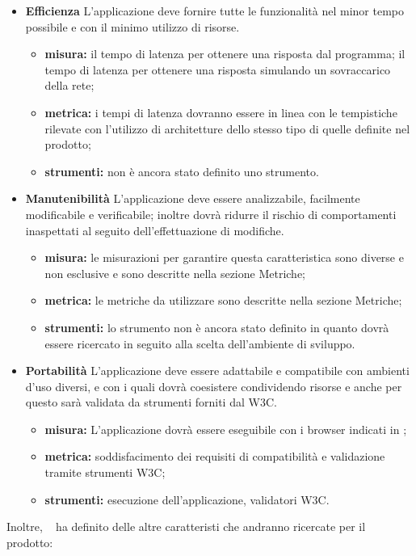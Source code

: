 \begin{itemize}
\item \textbf{Efficienza}
L’applicazione deve fornire tutte le funzionalità nel minor tempo possibile e con il minimo utilizzo di risorse.
\begin{itemize}
\item \textbf{misura:} il tempo di latenza per ottenere una risposta dal programma;
il tempo di latenza per ottenere una risposta simulando un sovraccarico della rete;
\item \textbf{metrica:} i tempi di latenza dovranno essere in linea con le tempistiche rilevate con l'utilizzo di architetture dello stesso tipo di quelle definite nel prodotto;
\item \textbf{strumenti:} non è ancora stato definito uno strumento.
\end{itemize}

\item \textbf{Manutenibilità}
L’applicazione deve essere analizzabile, facilmente modificabile e verificabile; inoltre dovrà ridurre il rischio di comportamenti inaspettati al seguito dell'effettuazione di modifiche.
\begin{itemize}
\item \textbf{misura:} le misurazioni per garantire questa caratteristica sono diverse e non esclusive e sono descritte nella sezione Metriche;
\item \textbf{metrica:} le metriche da utilizzare sono descritte nella sezione Metriche;
\item \textbf{strumenti:} lo strumento non è ancora stato definito in quanto dovrà essere ricercato in seguito alla scelta dell'ambiente di sviluppo.
\end{itemize}

\item \textbf{Portabilità}
L’applicazione deve essere adattabile e compatibile con ambienti d’uso diversi, e con i quali dovrà coesistere condividendo risorse e anche per questo sarà validata da strumenti forniti dal W3C.
\begin{itemize}
\item \textbf{misura:} L'applicazione dovrà essere eseguibile con i browser indicati in \infoAR;
\item \textbf{metrica:} soddisfacimento dei requisiti di compatibilità e validazione tramite strumenti W3C;
\item \textbf{strumenti:} esecuzione dell'applicazione, validatori W3C.
\end{itemize}
\end{itemize}
Inoltre, \gruppo ~ ha definito delle altre caratteristi che andranno ricercate per il prodotto:
